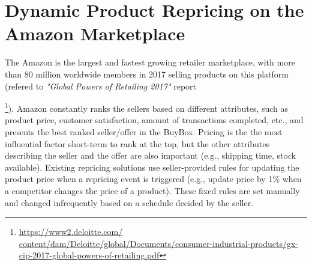 \section{Dynamic Product Repricing on the Amazon Marketplace}
\label{sec:intoAMZ}
The Amazon is the largest and fastest growing 
retailer marketplace, with more than 80 million worldwide members in 2017 selling products on this platform (refered to \textit{"Global Powers of Retailing 2017"} report{\footnote{\url{https://www2.deloitte.com/
			content/dam/Deloitte/global/Documents/consumer-industrial-products/gx-cip-2017-global-powers-of-retailing.pdf}}).
Amazon constantly ranks the sellers based on different attributes, 
such as product price, customer satisfaction, amount of transactions completed, etc., and presents the best ranked seller/offer in the BuyBox. 
Pricing is the the most influential factor short-term to rank at the top, but the other attributes describing the seller and the offer are also important (e.g., shipping time, 
stock available).
Existing repricing solutions use seller-provided rules for updating the product price when a repricing event is triggered 
(e.g., update price by 1\% when a competitor changes the price of a product). 
These fixed rules are set manually and changed infrequently based on a schedule decided by the seller.

}
